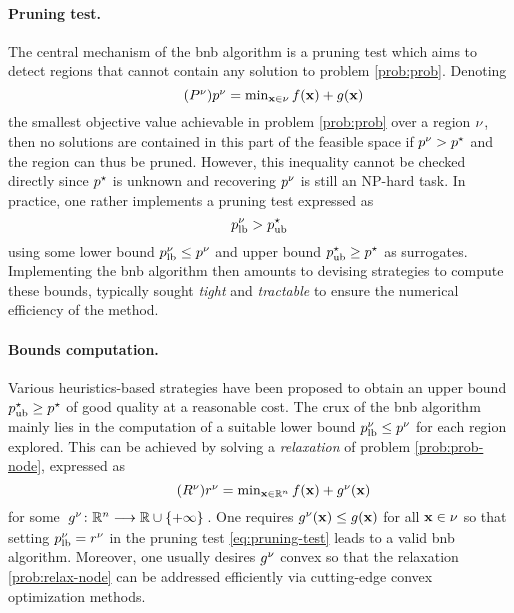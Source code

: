 \documentclass[11pt]{article}
\begin{document}
\paragraph{Pruning test.}
The central mechanism of the \gls{bnb} algorithm is a pruning test which aims to detect regions that cannot contain any solution to problem \eqref{prob:prob}.
Denoting 
\begin{equation}
    \label{prob:prob-node}
    \tag{$\node{\ppb}$}
    \textstyle
    \node{\pobj} = \min_{\pv \in \nodesymbol} \lfunc(\pv) + \rfunc(\pv)
\end{equation}
the smallest objective value achievable in problem \eqref{prob:prob} over a region $\nu$, then no solutions are contained in this part of the feasible space if $p^\nu > p^{\star}$ and the region can thus be pruned.
However, this inequality cannot be checked directly since $p^{\star}$ is unknown and recovering $p^\nu$ is still an NP-hard task.
In practice, one rather implements a pruning test expressed as
\begin{equation}
    \label{eq:pruning-test}
    p_{\text{lb}}^\nu > p_{\text{ub}}^{\star}
\end{equation}
using some lower bound $p_{\text{lb}}^\nu \leq p^\nu$ and upper bound $p_{\text{ub}}^{\star} \geq p^{\star}$ as surrogates.
Implementing the \gls{bnb} algorithm then amounts to devising strategies to compute these bounds, typically sought \emph{tight} and \emph{tractable} to ensure the numerical efficiency of the method.

\paragraph{Bounds computation.}
Various heuristics-based strategies have been proposed to obtain an upper bound $p_{\text{ub}}^{\star} \geq p^{\star}$ of good quality at a reasonable cost.
The crux of the \gls{bnb} algorithm mainly lies in the computation of a suitable lower bound $p_{\text{lb}}^\nu \leq p^\nu$ for each region explored.
This can be achieved by solving a \emph{relaxation} of problem \eqref{prob:prob-node}, expressed as
\begin{equation}
    \label{prob:relax-node}
    \tag{$\node{\rpb}$}
    \textstyle
    \node{\robj} = \min_{\pv \in \kR^{\pdim}} \lfunc(\pv) + \node{\rfunc}(\pv)
\end{equation}
for some $\kfuncdef{\node{\rfunc}}{\kR^{\pdim}}{\kR \cup \{+\infty\}}$.
One requires $g^\nu(\mathbf{x}) \leq g(\mathbf{x})$ for all $\mathbf{x} \in \nu$ so that setting $p_{\text{lb}}^\nu = r^\nu$ in the pruning test \eqref{eq:pruning-test} leads to a valid \gls{bnb} algorithm.
Moreover, one usually desires $g^\nu$ convex so that the relaxation \eqref{prob:relax-node} can be addressed efficiently via cutting-edge convex optimization methods.
\end{document}
